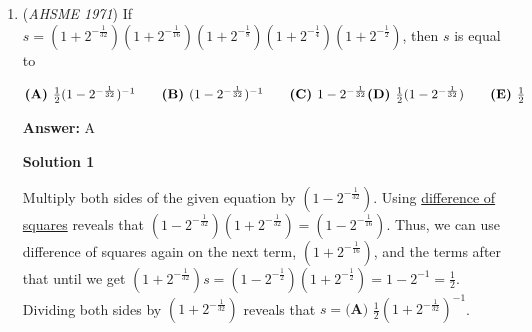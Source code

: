 \begin{enumerate}
 With that train of thought, we see that 

 
 \[BD^2=AD^2-AB^2\]

 \[BD^2=4^2-1^2\]

 \[BD^2=15 \Rightarrow BD = \sqrt{15}\]

 To let us formulate that rest of our lengths, let $CD=x$. Then, similar to the above, 

 
 \[AC^2=AD^2-CD^2\]

 \[AC^2=4^2-x^2=16-x^2\]

 \[AC=\sqrt{16-x^2}\]

 Now that we have all of the side lengths and diagonal lengths in one variable, we use Ptolemy's Theorem to finish from here: 

 
 \[4\cdot1 + x\cdot1 = \sqrt{15}\sqrt{16-x^2}\]

 \[x+4=\sqrt{240-15x^2}\]

 \[x^2+8x+16=240-15x^2\]

 \[16x^2+8x-224=0\]

 \[2x^2+x-28=0\]

 \[x=\frac{-1 \pm \sqrt{1-(4)(2)(-28)}}{2(2)}=\frac{-1\pm \sqrt{225}}{4}=\frac{-1 \pm 15}{4}\]

 Since the negative solution is extraneous, we see that our solution is $x=\frac{7}{2}\Rightarrow\boxed{\textbf{(A)}}$



	\item (\textit{AHSME 1971}) If $s=(1+2^{-\frac{1}{32}})(1+2^{-\frac{1}{16}})(1+2^{-\frac{1}{8}})(1+2^{-\frac{1}{4}})(1+2^{-\frac{1}{2}})$, then $s$ is equal to


 $\textbf{(A) }\textstyle{\frac{1}{2}}(1-2^{-\frac{1}{32}})^{-1}\qquad \textbf{(B) }(1-2^{-\frac{1}{32}})^{-1}\qquad \textbf{(C) }1-2^{-\frac{1}{32}}\qquad \\ \textbf{(D) }\textstyle{\frac{1}{2}}(1-2^{-\frac{1}{32}})\qquad  \textbf{(E) }\frac{1}{2}$

 \textbf{Answer: }A



\textbf{Solution 1}

Multiply both sides of the given equation by $(1-2^{-\frac1{32}})$. Using \href{https://artofproblemsolving.com/wiki/index.php?title=Difference\_of\_squares}{difference of squares} reveals that $(1-2^{-\frac1{32}})(1+2^{-\frac1{32}})=(1-2^{-\frac1{16}})$. Thus, we can use difference of squares again on the next term, $(1+2^{-\frac1{16}})$, and the terms after that until we get $(1+2^{-\frac1{32}})s=(1-2^{-\frac12})(1+2^{-\frac12})=1-2^{-1}=\frac12$. Dividing both sides by $(1+2^{-\frac1{32}})$ reveals that $s=\boxed{\textbf{(A) }\frac12(1+2^{-\frac1{32}})^{-1}}$.


\end{enumerate}
